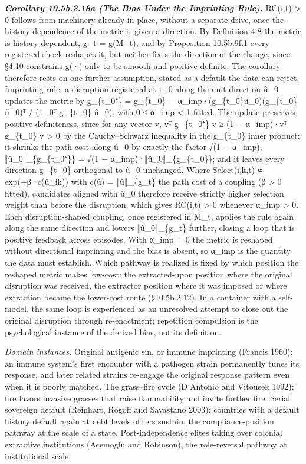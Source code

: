 \documentclass[
]{article}
\begin{document}
\emph{\textbf{Corollary 10.5b.2.18a (The Bias Under the Imprinting
Rule).}} RC(i,t) \textgreater{} 0 follows from machinery already in
place, without a separate drive, once the history-dependence of the
metric is given a direction. By Definition 4.8 the metric is
history-dependent, g\_t = g(M\_t), and by Proposition 10.5b.9f.1 every
registered shock reshapes it, but neither fixes the direction of the
change, since §4.10 constrains g(·) only to be smooth and
positive-definite. The corollary therefore rests on one further
assumption, stated as a default the data can reject. Imprinting rule: a
disruption registered at t\_0 along the unit direction û\_0 updates the
metric by g\_\{t\_0⁺\} = g\_\{t\_0\} −
α\_imp·(g\_\{t\_0\}û\_0)(g\_\{t\_0\}û\_0)ᵀ / (û\_0ᵀ g\_\{t\_0\} û\_0),
with 0 ≤ α\_imp \textless{} 1 fitted. The update preserves
positive-definiteness, since for any vector v, vᵀ g\_\{t\_0⁺\} v ≥ (1 −
α\_imp)·vᵀ g\_\{t\_0\} v \textgreater{} 0 by the Cauchy--Schwarz
inequality in the g\_\{t\_0\} inner product; it shrinks the path cost
along û\_0 by exactly the factor √(1 − α\_imp), ‖û\_0‖\_\{g\_\{t\_0⁺\}\}
= √(1 − α\_imp)·‖û\_0‖\_\{g\_\{t\_0\}\}; and it leaves every direction
g\_\{t\_0\}-orthogonal to û\_0 unchanged. Where Select(i,k,t) ∝
exp(−β·c(û\_ik)) with c(û) = ‖û‖\_\{g\_t\} the path cost of a coupling
(β \textgreater{} 0 fitted), candidates aligned with û\_0 therefore
receive strictly higher selection weight than before the disruption,
which gives RC(i,t) \textgreater{} 0 whenever α\_imp \textgreater{} 0.
Each disruption-shaped coupling, once registered in M\_t, applies the
rule again along the same direction and lowers ‖û\_0‖\_\{g\_t\} further,
closing a loop that is positive feedback across episodes. With α\_imp =
0 the metric is reshaped without directional imprinting and the bias is
absent, so α\_imp is the quantity the data must establish. Which pathway
is realized is fixed by which position the reshaped metric makes
low-cost: the extracted-upon position where the original disruption was
received, the extractor position where it was imposed or where
extraction became the lower-cost route (§10.5b.2.12). In a container
with a self-model, the same loop is experienced as an unresolved attempt
to close out the original disruption through re-enactment; repetition
compulsion is the psychological instance of the derived bias, not its
definition.

\emph{Domain instances.} Original antigenic sin, or immune imprinting
(Francis 1960): an immune system's first encounter with a pathogen
strain permanently tunes its response, and later related strains
re-engage the original response pattern even when it is poorly matched.
The grass--fire cycle (D'Antonio and Vitousek 1992): fire favors
invasive grasses that raise flammability and invite further fire. Serial
sovereign default (Reinhart, Rogoff and Savastano 2003): countries with
a default history default again at debt levels others sustain, the
compliance-position pathway at the scale of a state. Post-independence
elites taking over colonial extractive institutions (Acemoglu and
Robinson), the role-reversal pathway at institutional scale.
\end{document}
